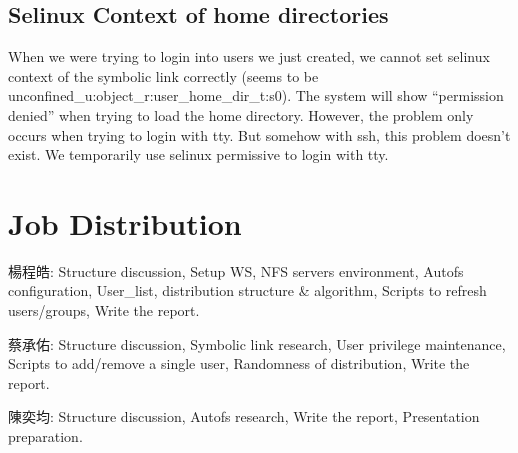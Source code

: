 \documentclass{article}
\begin{document}
\subsection{Selinux Context of home directories}
When we were trying to login into users we just created, we cannot set selinux context of the symbolic link correctly (seems to be unconfined\_u:object\_r:user\_home\_dir\_t:s0). The system will show ``permission denied'' when trying to load the home directory. However, the problem only occurs when trying to login with tty. But somehow  with ssh, this problem doesn't exist. We temporarily use selinux permissive to login with tty.

\section{Job Distribution}
楊程皓: Structure discussion, Setup WS, NFS servers environment, Autofs configuration, User\_list, distribution structure \& algorithm, Scripts to refresh users/groups, Write the report.

蔡承佑: Structure discussion, Symbolic link research, User privilege maintenance, Scripts to add/remove a single user, Randomness of distribution, Write the report.

陳奕均: Structure discussion, Autofs research, Write the report, Presentation preparation.
\end{document}
